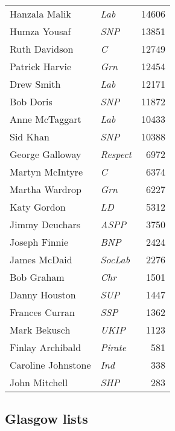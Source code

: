 {\footnotesize
\begin{tabular*}{\columnwidth}{@{\extracolsep{\fill}} p{} >{\itshape}l r @{\extracolsep{\fill}}}
Hanzala Malik & Lab & 14606\\%
Humza Yousaf & SNP & 13851\\%
Ruth Davidson & C & 12749\\%
Patrick Harvie & Grn & 12454\\%
Drew Smith & Lab & 12171\\%
Bob Doris & SNP & 11872\\%
Anne McTaggart & Lab & 10433\\%
\hline
Sid Khan & SNP & 10388\\
George Galloway & Respect & 6972\\
Martyn McIntyre & C & 6374\\
Martha Wardrop & Grn & 6227\\
Katy Gordon & LD & 5312\\
Jimmy Deuchars & ASPP & 3750\\
Joseph Finnie & BNP & 2424\\
James McDaid & SocLab & 2276\\
Bob Graham & Chr & 1501\\
Danny Houston & SUP & 1447\\
Frances Curran & SSP & 1362\\
Mark Bekusch & UKIP & 1123\\
Finlay Archibald & Pirate & 581\\
Caroline Johnstone & Ind & 338\\
John Mitchell & SHP & 283\\
\end{tabular*}

}

\subsection*{Glasgow lists}

